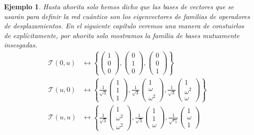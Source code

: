 \documentclass[a4paper]{report}
\newtheorem{example}{Ejemplo}
\begin{document}
\begin{example}
    Hasta ahorita solo hemos dicho que las bases de vectores
    que se usarán para definir la red cuántico son los
    eigenvectores de familias de operadores de
    desplazamientos. En el siguiente capítulo veremos una
    manera de constuirlos de explícitamente, por ahorita
    solo mostramos la familia de bases mutuamente
    insesgadas.
    \begin{align}
      \mathcal T(0,u)
      &\leftrightarrow \left\{
      \begin{pmatrix} 1\\0\\0 \end{pmatrix},
      \begin{pmatrix} 0\\1\\0 \end{pmatrix},
      \begin{pmatrix} 0\\0\\1 \end{pmatrix} 
      \right\} \\
      \mathcal T(u,0)
      &\leftrightarrow \left\{
        \frac{1}{\sqrt{3}}
        \begin{pmatrix} 1\\1\\1 \end{pmatrix},
        \frac{1}{\sqrt{3}}
        \begin{pmatrix} 1\\ \omega\\ \omega^2 \end{pmatrix},
        \frac{1}{\sqrt{3}}
        \begin{pmatrix} 1\\ \omega^2\\ \omega \end{pmatrix} 
      \right\} \\
      \mathcal T(u,u)
      &\leftrightarrow \left\{
        \frac{1}{\sqrt{3}}
        \begin{pmatrix} 1\\ \omega^2 \\ \omega^2
        \end{pmatrix},
        \frac{1}{\sqrt{3}}
        \begin{pmatrix} 1\\1\\ \omega \end{pmatrix},
        \frac{1}{\sqrt{r_3}}
        \begin{pmatrix} 1\\ \omega\\ 1 \end{pmatrix}

\end{align}
\end{example}
\end{document}
